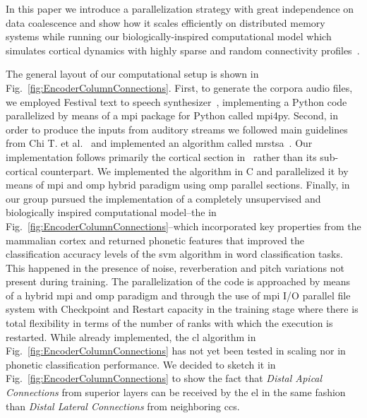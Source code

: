 \documentclass[10pt,journal,compsoc]{IEEEtran}
\begin{document}

In this paper we introduce a parallelization strategy with great independence on data coalescence and show how it scales efficiently on distributed memory systems while running our biologically-inspired computational model which simulates cortical dynamics with highly sparse and random connectivity profiles~\cite{Dematties2018}.

The general layout of our computational setup is shown in Fig.~\ref{fig:EncoderColumnConnections}. First, to generate the corpora audio files, we employed Festival text to speech synthesizer~\cite{festival2014}, implementing a Python code parallelized by means of a \gls{mpi} package for Python called mpi4py. Second, in order to produce the inputs from auditory streams we followed main guidelines from Chi T. et al.~\cite{chi_2005} and implemented an algorithm called \gls{mrstsa}~\cite{Dematties2018}. Our implementation follows primarily the cortical section in~\cite{chi_2005} rather than its sub-cortical counterpart. We implemented the algorithm in C and parallelized it by means of \gls{mpi} and \gls{omp} hybrid paradigm using \gls{omp} parallel sections. Finally, in~\cite{Dematties2018} our group pursued the implementation of a completely unsupervised and biologically inspired computational model--the  in Fig.~\ref{fig:EncoderColumnConnections}--which incorporated key properties from the mammalian cortex and returned phonetic features that improved the classification accuracy levels of the \gls{svm} algorithm in word classification tasks. This happened in the presence of noise, reverberation and pitch variations not present during training. The parallelization of the code is approached by means of a hybrid \gls{mpi} and \gls{omp} paradigm and through the use of \gls{mpi} I/O parallel file system with Checkpoint and Restart capacity in the training stage where there is total flexibility in terms of the number of ranks with which the execution is restarted. While already implemented, the \gls{cl} algorithm in Fig.~\ref{fig:EncoderColumnConnections} has not yet been tested in scaling nor in phonetic classification performance. We decided to sketch it in Fig.~\ref{fig:EncoderColumnConnections} to show the fact that \emph{Distal Apical Connections} from superior layers can be received by the \gls{el} in the same fashion than \emph{Distal Lateral Connections} from neighboring \glspl{cc}. 
\end{document}
